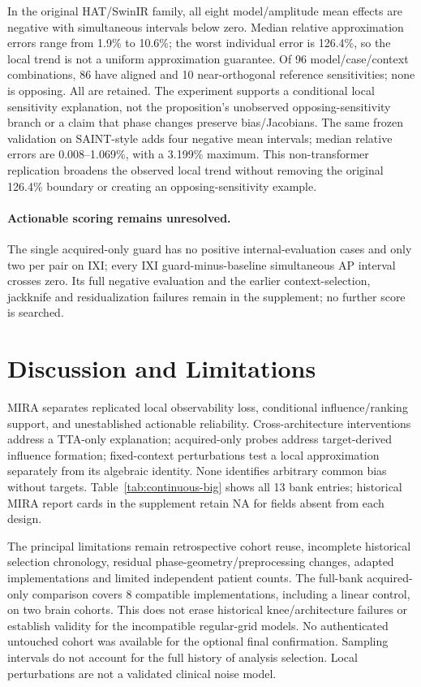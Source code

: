 \documentclass[10pt,twocolumn,letterpaper]{article}
\begin{document}
In the original HAT/SwinIR family, all eight model/amplitude mean effects are negative with simultaneous intervals below zero. Median relative approximation errors range from 1.9\% to 10.6\%; the worst individual error is 126.4\%, so the local trend is not a uniform approximation guarantee. Of 96 model/case/context combinations, 86 have aligned and 10 near-orthogonal reference sensitivities; none is opposing. All are retained. The experiment supports a conditional local sensitivity explanation, not the proposition's unobserved opposing-sensitivity branch or a claim that phase changes preserve bias/Jacobians. The same frozen validation on SAINT-style adds four negative mean intervals; median relative errors are 0.008--1.069\%, with a 3.199\% maximum. This non-transformer replication broadens the observed local trend without removing the original 126.4\% boundary or creating an opposing-sensitivity example.

\paragraph{Actionable scoring remains unresolved.}
The single acquired-only guard has no positive internal-evaluation cases and only two per pair on IXI; every IXI guard-minus-baseline simultaneous AP interval crosses zero. Its full negative evaluation and the earlier context-selection, jackknife and residualization failures remain in the supplement; no further score is searched.



\section{Discussion and Limitations}
MIRA separates replicated local observability loss, conditional influence/ranking support, and unestablished actionable reliability. Cross-architecture interventions address a TTA-only explanation; acquired-only probes address target-derived influence formation; fixed-context perturbations test a local approximation separately from its algebraic identity. None identifies arbitrary common bias without targets. Table~\ref{tab:continuous-big} shows all 13 bank entries; historical MIRA report cards in the supplement retain NA for fields absent from each design.

The principal limitations remain retrospective cohort reuse, incomplete historical selection chronology, residual phase-geometry/preprocessing changes, adapted implementations and limited independent patient counts. The full-bank acquired-only comparison covers 8 compatible implementations, including a linear control, on two brain cohorts. This does not erase historical knee/architecture failures or establish validity for the incompatible regular-grid models. No authenticated untouched cohort was available for the optional final confirmation. Sampling intervals do not account for the full history of analysis selection. Local perturbations are not a validated clinical noise model.
\end{document}
